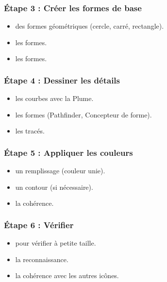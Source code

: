 \subsubsection{Étape 3 : Créer les formes de base}

\begin{itemize}
    \item {} des formes géométriques (cercle, carré, rectangle).
    \item {} les formes.
    \item {} les formes.
\end{itemize}

\subsubsection{Étape 4 : Dessiner les détails}

\begin{itemize}
    \item {} les courbes avec la Plume.
    \item {} les formes (Pathfinder, Concepteur de forme).
    \item {} les tracés.
\end{itemize}

\subsubsection{Étape 5 : Appliquer les couleurs}

\begin{itemize}
    \item {} un remplissage (couleur unie).
    \item {} un contour (si nécessaire).
    \item {} la cohérence.
\end{itemize}

\subsubsection{Étape 6 : Vérifier}

\begin{itemize}
    \item {} pour vérifier à petite taille.
    \item {} la reconnaissance.
    \item {} la cohérence avec les autres icônes.
\end{itemize}

